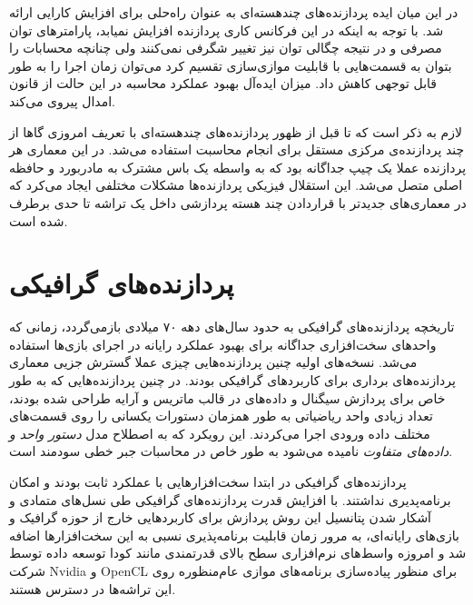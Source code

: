 \documentclass{thesis}
\begin{document}
 در این میان ایده
  پردازنده‌های چندهسته‌ای به عنوان راه‌حلی
برای افزایش کارایی ارائه شد. با توجه به اینکه در این فرکانس کاری پردازنده
افزایش نمیابد، پارامتر‌های توان مصرفی و در نتیجه چگالی توان نیز تغییر شگرفی
نمی‌کنند ولی چنانچه محسابات را بتوان به قسمت‌هایی با قابلیت موازی‌سازی تقسیم
کرد می‌توان زمان اجرا را به طور قابل توجهی کاهش داد. میزان 
ایده‌آل
بهبود عملکرد محاسبه
در این حالت از قانون امدال
پیروی می‌کند.

 لازم به ذکر است که تا قبل از ظهور پردازنده‌های چندهسته‌ای با 
تعریف امروزی گاها
از
چند پردازنده‌ی مرکزی مستقل برای انجام محاسبت استفاده می‌شد.  در این معماری هر
پردازنده عملا یک چیپ جداگانه بود که به واسطه یک باس
مشترک به مادربورد و حافظه اصلی متصل می‌شد. این استقلال فیزیکی پردازنده‌ها
مشکلات مختلفی ایجاد می‌کرد که در معماری‌های جدیدتر با قراردادن چند هسته
 پردازشی
داخل یک تراشه 
تا حدی برطرف شده است.

\section{
پردازنده‌های گرافیکی
}

تاریخچه پردازنده‌های گرافیکی به حدود سال‌های دهه ۷۰ میلادی بازمی‌گردد، زمانی که
واحد‌های سخت‌افزاری جداگانه برای بهبود عملکرد رایانه در اجرای باز‌ی‌ها استفاده
می‌شد. نسخه‌های اولیه چنین پردازنده‌هایی چیزی عملا گسترش جزیی معماری
پردازنده‌های
برداری
برای کاربرد‌های گرافیکی بودند. در چنین پردازنده‌هایی که به طور خاص برای پردازش
سیگنال
و
داده‌های
در
قالب ماتریس و آرایه طراحی شده بودند، تعداد زیادی واحد ریاضیاتی
 به طور
همزمان دستورات یکسانی را روی قسمت‌های مختلف داده ورودی اجرا می‌کردند. این
رویکرد که به اصطلاح مدل
\textit{دستور واحد و داده‌های متفاوت}
نامیده می‌شود
به طور خاص در محاسبات جبر خطی
سودمند است.

پردازنده‌های گرافیکی در ابتدا سخت‌افزار‌هایی با عملکرد ثابت
بودند و امکان برنامه‌پدیری 
نداشتند.
با افزایش قدرت پردازنده‌های گرافیکی طی نسل‌های متمادی و آشکار شدن پتانسیل این
روش پردازش برای کاربرد‌هایی خارج از حوزه گرافیک و بازی‌های رایانه‌ای، به مرور
زمان قابلیت برنامه‌پذیری نسبی به این سخت‌افزار‌ها اضافه شد و امروزه واسط‌های
نرم‌افزاری سطح بالای قدرتمندی مانند کودا
 توسعه داده
توسط شرکت
Nvidia
و
OpenCL
برای منظور پیاده‌سازی برنامه‌های موازی عام‌منظوره روی این تراشه‌ها 
در دسترس هستند.
\end{document}
